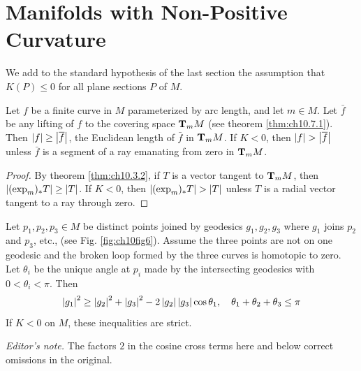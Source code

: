 \documentclass[../main]{subfiles}
\begin{document}
\section{Manifolds with Non-Positive Curvature}\label{ch10:s8}

We add to the standard hypothesis of the last section the assumption that $K(P)\le0$ for all plane sections $P$ of $M$.



\begin{lemma} \label{lem:ch10.8.1}
Let $f$ be a finite curve in $M$ parameterized by arc length, and let $m\in M$. Let $\bar f$ be any lifting of $f$ to the covering space $\ts Mm$ (see theorem \ref{thm:ch10.7.1}). Then $\norm f\ge\norm{\bar f}$, the Euclidean length of $\bar f$ in $\ts Mm$. If $K<0$, then $\norm f>\norm{\bar f}$ unless $\bar f$ is a segment of a ray emanating from zero in $\ts Mm$.
\end{lemma}

\begin{proof}
By theorem \ref{thm:ch10.3.2}, if $T$ is a vector tangent to $\ts Mm$, then \newline $\norm{(\exp_m)_*T}\ge\norm T$. If $K<0$, then $\norm{(\exp_m)_*T}>\norm T$ unless $T$ is a radial vector tangent to a ray through zero.
\end{proof}



\begin{theorem} \label{thm:ch10.8.2}
Let $p_1,p_2,p_3\in M$ be distinct points joined by geodesics $g_1,g_2,g_3$ where $g_1$ joins $p_2$ and $p_3$, etc., (see Fig. \ref{fig:ch10fig6}). Assume the three points are not on one geodesic and the broken loop formed by the three curves is homotopic to zero. Let $\theta_i$ be the unique angle at $p_i$ made by the intersecting geodesics with $0<\theta_i<\pi$. Then
\[\norm{g_1}^2 \ge \norm{g_2}^2 + \norm{g_3}^2 - 2\norm{g_2}\norm{g_3}\cos\theta_1,
\quad \theta_1+\theta_2+\theta_3\le\pi\]
If $K<0$ on $M$, these inequalities are strict.
\end{theorem}
\noindent\emph{Editor's note.} The factors $2$ in the cosine cross terms here and below correct omissions in the original.
\end{document}
